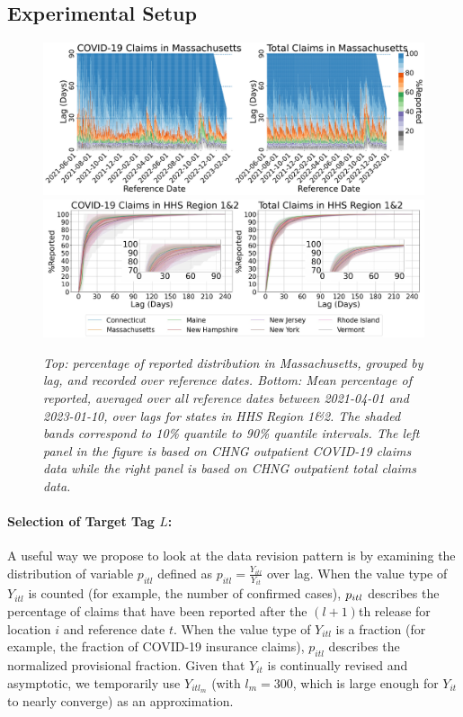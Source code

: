 \subsection{Experimental Setup}
\begin{figure}[h!]
    \centering
    \includegraphics[width=\textwidth]{figs/completeness_Massachusetts.pdf}
    \includegraphics[width=\textwidth]{figs/completeness_lineplot_hhs1&2.pdf}
    \caption{\emph{Top: percentage of reported distribution in Massachusetts, grouped by lag, and recorded over reference dates. Bottom: Mean percentage of reported, averaged over all reference dates between 2021-04-01 and 2023-01-10, over lags for states in HHS Region 1\&2. The shaded bands correspond to 10\% quantile to 90\% quantile intervals. The left panel in the figure is based on CHNG outpatient COVID-19 claims data while the right panel is based on CHNG outpatient total claims data.}}
\end{figure}

\paragraph{Selection of Target Tag $L$:}
A useful way we propose to look at the data revision pattern is by examining the distribution of variable $p_{itl}$ defined as $p_{itl} = \frac{Y_{itl}}{Y_{it}}$
over lag. 
When the value type of $Y_{itl}$ is counted (for example, the number of confirmed cases), $p_{itl} \time 100$ describes the percentage of claims that have been reported after the $(l+1)$th release for location $i$ and reference date $t$. When the value type of $Y_{itl}$ is a fraction (for example, the fraction of COVID-19 insurance claims), $p_{itl}$ describes the normalized provisional fraction. Given that $Y_{it}$ is continually revised and asymptotic, we temporarily use $Y_{itl_m}$ (with $l_m = 300$, which is large enough for $Y_{it}$ to nearly converge) as an approximation. 



